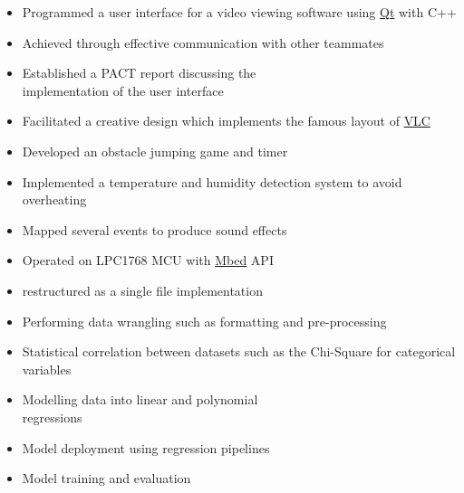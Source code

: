\documentclass[11pt,a4paper,ragged2e]{altacv}
\begin{document}
\begin{paracol}{2}
\begin{itemize}
\item Programmed a user interface for a video viewing software using \href{https://www.qt.io/}{Qt} with C++
\item Achieved through effective communication with other teammates
\item Established a PACT report discussing the \\ implementation of the user interface
\item Facilitated a creative design which implements the famous layout of \href{https://www.videolan.org/vlc/index.en_GB.html}{VLC}
\end{itemize}
\divider

\begin{itemize}
\item Developed an obstacle jumping game and timer
\item Implemented a temperature and humidity detection system to avoid overheating
\item Mapped several events to produce sound effects
\item Operated on LPC1768 MCU with \href{https://os.mbed.com/}{Mbed} API
\item restructured as a single file implementation
\end{itemize}


\switchcolumn
\newpage

\begin{itemize}
\item Performing data wrangling  such as formatting and pre-processing
\item Statistical correlation between datasets such as the Chi-Square for categorical variables
\item Modelling data into linear and polynomial \\ regressions
\item Model deployment using regression pipelines
\item Model training and evaluation
\end{itemize}
\divider


\end{paracol}
\end{document}
